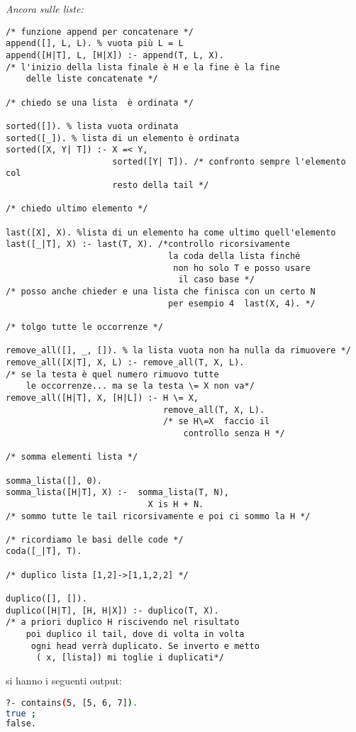 \documentclass[a4paper,12pt, oneside]{book}
\begin{document}
\newpage
\begin{esercizio}
\textit{Ancora sulle liste:}
\begin{verbatim}
/* funzione append per concatenare */
append([], L, L). % vuota più L = L
append([H|T], L, [H|X]) :- append(T, L, X). 
/* l'inizio della lista finale è H e la fine è la fine 
    delle liste concatenate */

/* chiedo se una lista  è ordinata */

sorted([]). % lista vuota ordinata 
sorted([_]). % lista di un elemento è ordinata 
sorted([X, Y| T]) :- X =< Y,
                     sorted([Y| T]). /* confronto sempre l'elemento col 
                     resto della tail */

/* chiedo ultimo elemento */

last([X], X). %lista di un elemento ha come ultimo quell'elemento 
last([_|T], X) :- last(T, X). /*controllo ricorsivamente 
                                la coda della lista finché
                                 non ho solo T e posso usare
                                  il caso base */
/* posso anche chieder e una lista che finisca con un certo N
                                per esempio 4  last(X, 4). */

/* tolgo tutte le occorrenze */

remove_all([], _, []). % la lista vuota non ha nulla da rimuovere */
remove_all([X|T], X, L) :- remove_all(T, X, L). 
/* se la testa è quel numero rimuovo tutte
    le occorrenze... ma se la testa \= X non va*/
remove_all([H|T], X, [H|L]) :- H \= X,
                               remove_all(T, X, L). 
                               /* se H\=X  faccio il
                                   controllo senza H */

/* somma elementi lista */

somma_lista([], 0).
somma_lista([H|T], X) :-  somma_lista(T, N),
                            X is H + N. 
/* sommo tutte le tail ricorsivamente e poi ci sommo la H */

/* ricordiamo le basi delle code */
coda([_|T], T).

/* duplico lista [1,2]->[1,1,2,2] */

duplico([], []).
duplico([H|T], [H, H|X]) :- duplico(T, X). 
/* a priori duplico H riscivendo nel risultato
    poi duplico il tail, dove di volta in volta
     ogni head verrà duplicato. Se inverto e metto
      ( x, [lista]) mi toglie i duplicati*/
\end{verbatim}
si hanno i seguenti output:
\begin{shaded}
\begin{lstlisting}[language=bash]
?- contains(5, [5, 6, 7]).
true ;
false.


\end{lstlisting}
\end{shaded}
\end{esercizio}
\end{document}
